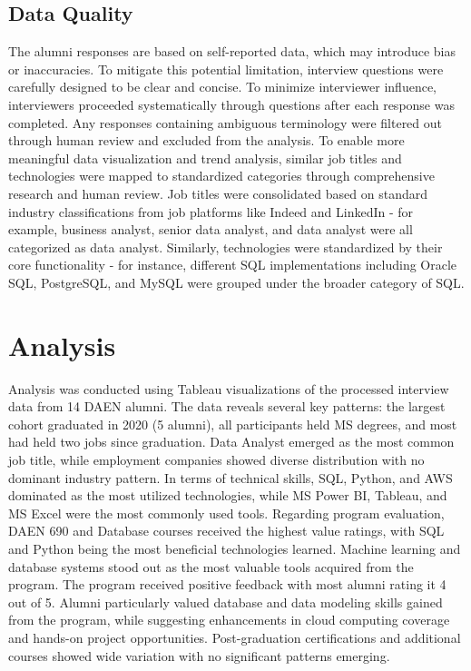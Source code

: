 \documentclass[12pt,a4paper]{article}
\begin{document}
\subsection{Data Quality}
The alumni responses are based on self-reported data, which may introduce bias or inaccuracies. To mitigate this potential limitation, interview questions were carefully designed to be clear and concise. To minimize interviewer influence, interviewers proceeded systematically through questions after each response was completed. Any responses containing ambiguous terminology were filtered out through human review and excluded from the analysis. To enable more meaningful data visualization and trend analysis, similar job titles and technologies were mapped to standardized categories through comprehensive research and human review. Job titles were consolidated based on standard industry classifications from job platforms like Indeed and LinkedIn - for example, business analyst, senior data analyst, and data analyst were all categorized as data analyst. Similarly, technologies were standardized by their core functionality - for instance, different SQL implementations including Oracle SQL, PostgreSQL, and MySQL were grouped under the broader category of SQL.

\section{Analysis}
Analysis was conducted using Tableau visualizations of the processed interview data from 14 DAEN alumni. The data reveals several key patterns: the largest cohort graduated in 2020 (5 alumni), all participants held MS degrees, and most had held two jobs since graduation. Data Analyst emerged as the most common job title, while employment companies showed diverse distribution with no dominant industry pattern. In terms of technical skills, SQL, Python, and AWS dominated as the most utilized technologies, while MS Power BI, Tableau, and MS Excel were the most commonly used tools. Regarding program evaluation, DAEN 690 and Database courses received the highest value ratings, with SQL and Python being the most beneficial technologies learned. Machine learning and database systems stood out as the most valuable tools acquired from the program. The program received positive feedback with most alumni rating it 4 out of 5. Alumni particularly valued database and data modeling skills gained from the program, while suggesting enhancements in cloud computing coverage and hands-on project opportunities. Post-graduation certifications and additional courses showed wide variation with no significant patterns emerging.
\end{document}

